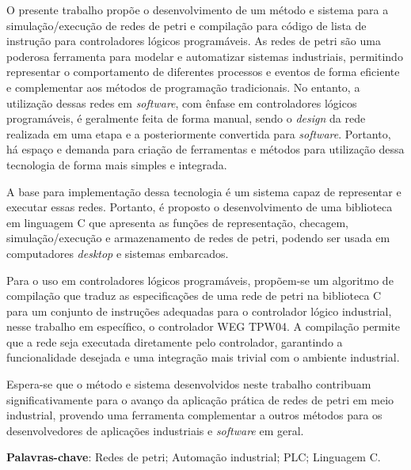 \setlength{\absparsep}{18pt} %
\begin{resumo}

O presente trabalho propõe o desenvolvimento de um método e sistema para a simulação/execução de redes de petri e compilação para código de lista de instrução para controladores lógicos programáveis. As redes de petri são uma poderosa ferramenta para modelar e automatizar sistemas industriais, permitindo representar o comportamento de diferentes processos e eventos de forma eficiente e complementar aos métodos de programação tradicionais. No entanto, a utilização dessas redes em \textit{software}, com ênfase em controladores lógicos programáveis, é geralmente feita de forma manual, sendo o \textit{design} da rede realizada em uma etapa e a posteriormente convertida para \textit{software}. Portanto, há espaço e demanda para criação de ferramentas e métodos para utilização dessa tecnologia de forma mais simples e integrada.

A base para implementação dessa tecnologia é um sistema capaz de representar e executar essas redes. Portanto, é proposto o desenvolvimento de uma biblioteca em linguagem C que apresenta as funções de representação, checagem, simulação/execução e armazenamento de redes de petri, podendo ser usada em computadores \textit{desktop} e sistemas embarcados. 

Para o uso em controladores lógicos programáveis, propõem-se um algoritmo de compilação que traduz as especificações de uma rede de petri na biblioteca C para um conjunto de instruções adequadas para o controlador lógico industrial, nesse trabalho em específico, o controlador WEG TPW04. A compilação permite que a rede seja executada diretamente pelo controlador, garantindo a funcionalidade desejada e uma integração mais trivial com o ambiente industrial.

Espera-se que o método e sistema desenvolvidos neste trabalho contribuam significativamente para o avanço da aplicação prática de redes de petri em meio industrial, provendo uma ferramenta complementar a outros métodos para os desenvolvedores de aplicações industriais e \textit{software} em geral.
	
\textbf{Palavras-chave}: Redes de petri; Automação industrial; PLC; Linguagem C.
\end{resumo}

